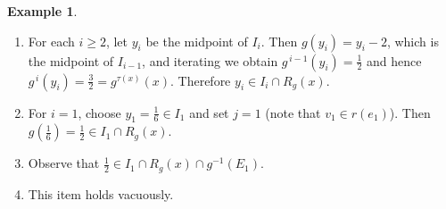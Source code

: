 \documentclass[12pt, reqno]{amsart}
\theoremstyle{definition}
\newtheorem{example}[theorem]{Example}
\theoremstyle{remark}
\numberwithin{equation}{section}
\begin{document}
\begin{example}
\begin{enumerate}
    \item For each $i\ge 2$, let $y_i$ be the midpoint of $I_i$. Then
          $g(y_i)=y_i-2$, which is the midpoint of $I_{i-1}$, and iterating we
          obtain $g^{\,i-1}(y_i)=\tfrac{1}{2}$ and hence
          $g^{\,i}(y_i)=\tfrac{3}{2}=g^{\tau(x)}(x)$. Therefore
          $y_i\in I_i\cap R_g(x)$.
    \item For $i=1$, choose $y_1=\tfrac{1}{6}\in I_1$ and set $j=1$ (note that
          $v_1\in r(e_1)$). Then $g(\tfrac{1}{6})=\tfrac{1}{2}\in I_1\cap R_g(x)$.
    \item Observe that $\tfrac{1}{2}\in I_1\cap R_g(x)\cap g^{-1}(E_1)$.
    \item This item holds vacuously.
\end{enumerate}

\end{example}
\end{document}
